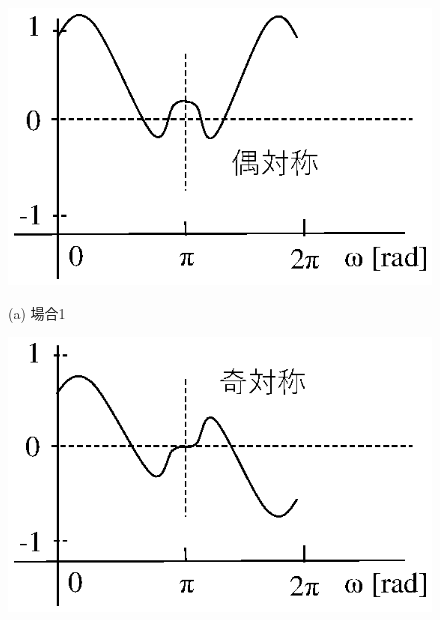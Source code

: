 \begin{figure}[H]
\begin{center}
\begin{minipage}{.35\textwidth}
\begin{center}
\includegraphics[width=.98\textwidth]{fig/zu-6-11-a.eps}

(a) 場合1
\end{center}
\end{minipage}
\begin{minipage}{.35\textwidth}
\begin{center}
\includegraphics[width=.98\textwidth]{fig/zu-6-11-b.eps}


\end{center}
\end{minipage}
\end{center}
\end{figure}
